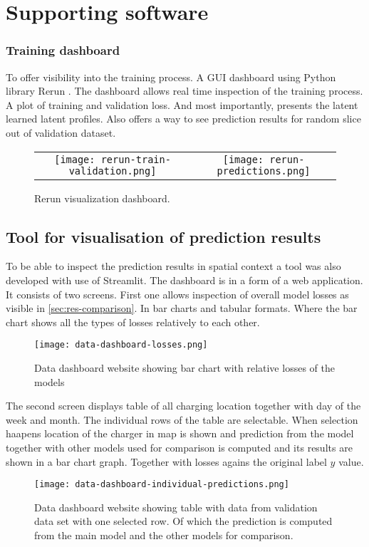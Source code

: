 \chapter{Supporting software}

\subsection{Training dashboard}

To offer visibility into the training process. A GUI dashboard using Python library Rerun . The dashboard allows real time inspection of the training process. A plot of training and validation loss. And most importantly, presents the latent learned latent profiles. Also offers a way to see prediction results for random slice out of validation dataset.

\begin{figure}[hb]
    \begin{tabular}{cc}
        \texttt{[image: rerun-train-validation.png]} &
        \texttt{[image: rerun-predictions.png]}
    \end{tabular}
    \caption{}{Rerun visualization dashboard.}
\end{figure}


\section{Tool for visualisation of prediction results}
To be able to inspect the prediction results in spatial context a tool was also developed with use of Streamlit. The dashboard is in a form of a web application.
It consists of two screens.
First one allows inspection of overall model losses as visible in \ref{sec:res-comparison}. In bar charts and tabular formats. Where the bar chart shows all the types of losses relatively to each other.
\begin{figure}
    \texttt{[image: data-dashboard-losses.png]}
    \caption[]{Data dashboard website showing bar chart with relative losses of the models}
\end{figure}

The second screen displays table of all charging location together with day of the week and month. The individual rows of the table are selectable. When selection haapens location of the charger in map is shown and prediction from the model together with other models used for comparison is computed and its results are shown in a bar chart graph. Together with losses agains the original label $y$ value.

\begin{figure}
    \texttt{[image: data-dashboard-individual-predictions.png]}
    \caption[]{Data dashboard website showing table with data from validation data set with one selected row. Of which the prediction is computed from the main model and the other models for comparison.}
\end{figure}